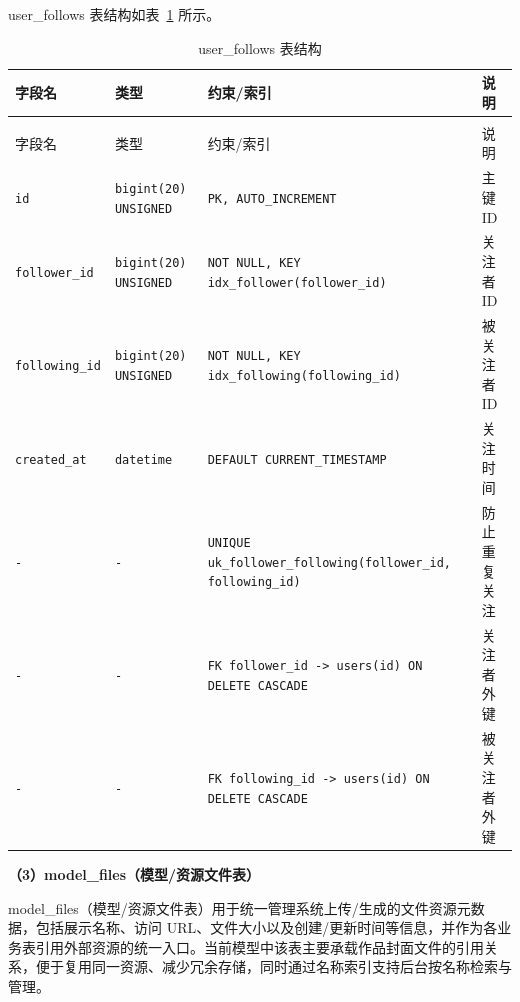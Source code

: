 \documentclass[twoside]{thesis-cls-Miya} %
\begin{document}
user\_follows 表结构如表~\ref{tab:user-follows} 所示。

{
\renewcommand{\arraystretch}{1.25}
\setlength{\tabcolsep}{0.2ex}
\begin{longtable}{@{}>{\raggedright\arraybackslash}p{} >{\raggedright\arraybackslash}p{} >{\raggedright\arraybackslash}p{} >{\raggedright\arraybackslash}p{}@{}}
\caption{user\_follows 表结构}\label{tab:user-follows}\\
\toprule
字段名 & 类型 & 约束/索引 & 说明 \\
\midrule
\endfirsthead

\multicolumn{4}{c}{\zihao{5}续表\thetable\quad user\_follows 表结构}\\
\toprule
字段名 & 类型 & 约束/索引 & 说明 \\
\midrule
\endhead

\bottomrule
\endfoot

\bottomrule
\endlastfoot

\texttt{id} & \texttt{bigint(20) UNSIGNED} & \texttt{PK, AUTO\_INCREMENT} & 主键 ID \\
\texttt{follower\_\allowbreak id} & \texttt{bigint(20) UNSIGNED} & \texttt{NOT NULL, KEY idx\_follower(follower\_id)} & 关注者 ID \\
\texttt{following\_\allowbreak id} & \texttt{bigint(20) UNSIGNED} & \texttt{NOT NULL, KEY idx\_following(following\_id)} & 被关注者 ID \\
\texttt{created\_\allowbreak at} & \texttt{datetime} & \texttt{DEFAULT CURRENT\_TIMESTAMP} & 关注时间 \\
\texttt{-} & \texttt{-} & \texttt{UNIQUE uk\_follower\_following(follower\_id, following\_id)} & 防止重复关注 \\
\texttt{-} & \texttt{-} & \texttt{FK follower\_id -> users(id) ON DELETE CASCADE} & 关注者外键 \\
\texttt{-} & \texttt{-} & \texttt{FK following\_id -> users(id) ON DELETE CASCADE} & 被关注者外键 \\
\end{longtable}
}

\noindent\textbf{（3）model\_files（模型/资源文件表）}

\noindent model\_files（模型/资源文件表）用于统一管理系统上传/生成的文件资源元数据，包括展示名称、访问 URL、文件大小以及创建/更新时间等信息，并作为各业务表引用外部资源的统一入口。当前模型中该表主要承载作品封面文件的引用关系，便于复用同一资源、减少冗余存储，同时通过名称索引支持后台按名称检索与管理。
\end{document}

